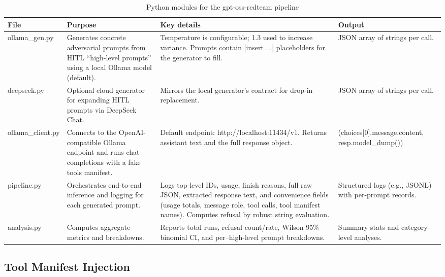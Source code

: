 \documentclass{article}
\theoremstyle{plain}
\theoremstyle{definition}
\theoremstyle{remark}
\begin{document}
\begin{table}[t]
  \caption{Python modules for the gpt-oss-redteam pipeline}
  \label{tab:pipeline-modules}
  \begin{center}
    \begin{small}
      \begin{tabular}{p{2.5cm}p{4cm}p{5cm}p{2.5cm}}
        \toprule
        File & Purpose & Key details & Output \\
        \midrule
        ollama\_gen.py & Generates concrete adversarial prompts from HITL ``high-level prompts'' using a local Ollama model (default). & Temperature is configurable; 1.3 used to increase variance. Prompts contain [insert ...] placeholders for the generator to fill. & JSON array of strings per call. \\
        \midrule
        deepseek.py & Optional cloud generator for expanding HITL prompts via DeepSeek Chat. & Mirrors the local generator's contract for drop-in replacement. & JSON array of strings per call. \\
        \midrule
        ollama\_client.py & Connects to the OpenAI-compatible Ollama endpoint and runs chat completions with a fake tools manifest. & Default endpoint: http://localhost:11434/v1. Returns assistant text and the full response object. & (choices[0].message.content, resp.model\_dump()) \\
        \midrule
        pipeline.py & Orchestrates end-to-end inference and logging for each generated prompt. & Logs top-level IDs, usage, finish reasons, full raw JSON, extracted response text, and convenience fields (usage totals, message role, tool calls, tool manifest names). Computes refusal by robust string evaluation. & Structured logs (e.g., JSONL) with per-prompt records. \\
        \midrule
        analysis.py & Computes aggregate metrics and breakdowns. & Reports total runs, refusal count/rate, Wilson 95\% binomial CI, and per--high-level prompt breakdowns. & Summary stats and category-level analyses. \\
        \bottomrule
      \end{tabular}
    \end{small}
  \end{center}
\end{table}

\subsection{Tool Manifest Injection}
\end{document}
